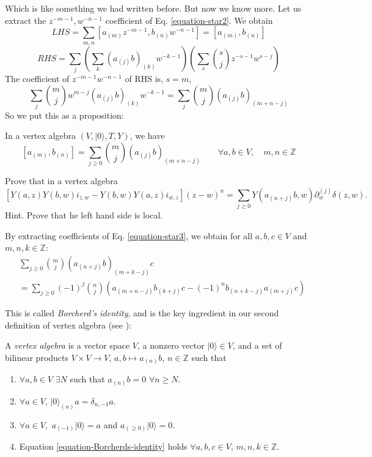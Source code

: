 Which is like something we had written before.
But now we know more. Let us extract
the $z^{-m-1},w^{-n-1}$ coefficient of Eq. \ref{equation-star2}.
We obtain
$$
LHS=\sum_{m,n}[a_{(m)}z^{-m-1},b_{(n)}w^{-n-1}]=[a_{(m)},b_{(n)}]
$$
$$
RHS=\sum_{j}\left(\sum_{k}(a_{(j)}b)_{(k)}w^{-k-1}\right)
\left(\sum_{s}\binom{s}{j}z^{-s-1}w^{s-j}\right)
$$
The coefficient of $z^{-m-1}w^{-n-1}$ of RHS is, $s=m$,
$$
\sum_{j}\binom{m}{j}w^{m-j}(a_{(j)}b)_{(k)}w^{-k-1}
=\sum_{j}\binom{m}{j}(a_{(j)}b)_{(m+n-j)}
$$
So we put this as a proposition:
\begin{proposition}
\label{proposition-commutator-formula}
In a vertex algebra $(V,|0\rangle,T,Y)$, we have
$$
[a_{(m)},b_{(n)}]=\sum_{j \geq 0}\binom{m}{j}(a_{(j)}b)_{(m+n-j)}
\qquad \forall a,b \in V,\quad m,n\in \mathbb{Z}
$$
\end{proposition}

\begin{exercise}
\label{exercise-its-what-it-is}
Prove that in a vertex algebra
\begin{equation}
\label{equation-star3}
[Y(a,z)Y(b,w)i_{z,w}-Y(b,w)Y(a,z)i_{w,z}](z-w)^n
=\sum_{j \geq 0}Y(a_{(n+j)}b,w)\partial_w^{(j)}\delta(z,w).
\end{equation}
Hint. Prove that he left hand side is local.
\end{exercise}

By extracting coefficients of Eq. \ref{equation-star3}, we obtain
for all $a,b,c \in V$ and $m,n,k \in \mathbb{Z}$:
\begin{equation}
\label{equation-Borcherds-identity}
\begin{aligned}
&\sum_{j \geq 0}\binom{m}{j}(a_{(n+j)}b)_{(m+k-j)}c\\
&=\sum_{j \geq 0}(-1)^j \binom{n}{j}
\left(a_{(m+n-j)}b_{(k+j)}c-(-1)^nb_{(n+k-j)}a_{(m+j)}c\right)
\end{aligned}
\end{equation}

This is called {\it Borcherd's identity}, and is the key
ingredient in our second definition of vertex algebra
(see \cite[Proposition 4.8(b)]{VAFB}):

\begin{definition}
\label{definition-vertex-algebra2}
A {\it vertex algebra} is a vector space $V$,
a nonzero vector $|0\rangle\in V$,
and a set of bilinear products
$V \times V \to V$, $a,b \mapsto a_{(n)}b$, $n \in \mathbb{Z}$
such that
\begin{enumerate}
\item $\forall a,b \in V$ $\exists N$ such that $a_{(n)}b=0$
$\forall n \geq N$.
\item $\forall  a \in V$, $|0\rangle_{(n)}a=\delta_{n,-1}a$.
\item $\forall a \in V,$ $a_{(-1)}|0\rangle =a$ and $a_{(\geq 0)}|0\rangle=0$.
\item Equation \ref{equation-Borcherds-identity} holds
$\forall a,b,c \in V$, $m,n,k \in \mathbb{Z}$.
\end{enumerate}
\end{definition}

